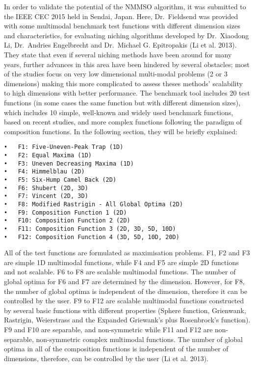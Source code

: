 \documentclass[12pt,a4paper]{article}
\begin{document}
In order to validate the potential of the NMMSO algorithm, it was
submitted to the IEEE CEC 2015 held in Sendai, Japan. Here,
Dr.~Fieldsend was provided with some multimodal benchmark test functions
with different dimension sizes and characteristics, for evaluating
niching algorithms developed by Dr.~Xiaodong Li, Dr.~Andries Engelbrecht
and Dr.~Michael G. Epitropakis (Li et al. 2013). They state that even if
several niching methods have been around for many years, further
advances in this area have been hindered by several obstacles; most of
the studies focus on very low dimensional multi-modal problems (2 or 3
dimensions) making this more complicated to assess theses methods'
scalability to high dimensions with better performance. The benchmark
tool includes 20 test functions (in some cases the same function but
with different dimension sizes), which includes 10 simple, well-known
and widely used benchmark functions, based on recent studies, and more
complex functions following the paradigm of composition functions. In
the following section, they will be briefly explained:

\begin{verbatim}
•   F1: Five-Uneven-Peak Trap (1D)
•   F2: Equal Maxima (1D)
•   F3: Uneven Decreasing Maxima (1D)
•   F4: Himmelblau (2D)
•   F5: Six-Hump Camel Back (2D)
•   F6: Shubert (2D, 3D)
•   F7: Vincent (2D, 3D)
•   F8: Modified Rastrigin - All Global Optima (2D)
•   F9: Composition Function 1 (2D)
•   F10: Composition Function 2 (2D)
•   F11: Composition Function 3 (2D, 3D, 5D, 10D)
•   F12: Composition Function 4 (3D, 5D, 10D, 20D)
\end{verbatim}

All of the test functions are formulated as maximisation problems. F1,
F2 and F3 are simple 1D multimodal functions, while F4 and F5 are simple
2D functions and not scalable. F6 to F8 are scalable multimodal
functions. The number of global optima for F6 and F7 are determined by
the dimension. However, for F8, the number of global optima is
independent of the dimension, therefore it can be controlled by the
user. F9 to F12 are scalable multimodal functions constructed by several
basic functions with different properties (Sphere function, Grienwank,
Rastrigin, Weierstrass and the Expanded Griewank's plus Rosenbrock's
function). F9 and F10 are separable, and non-symmetric while F11 and F12
are non-separable, non-symmetric complex multimodal functions. The
number of global optima in all of the composition functions is
independent of the number of dimensions, therefore, can be controlled by
the user (Li et al. 2013).
\end{document}
